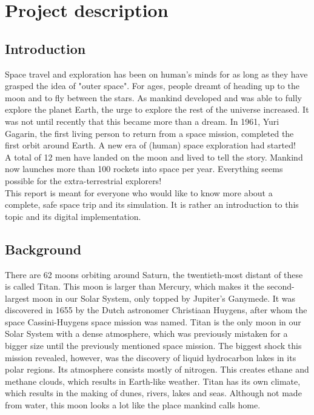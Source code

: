\documentclass[10pt,a4paper]{article}
\begin{document}
	\section{Project description}
	
	\subsection{Introduction}
	Space travel and exploration has been on human's minds for as long as they have grasped the idea of "outer space". For ages, people dreamt of heading up to the moon and to fly between the stars. As mankind developed and was able to fully explore the planet Earth, the urge to explore the rest of the universe increased. It was not until recently that this became more than a dream. In 1961, Yuri Gagarin, the first living person to return from a space mission, completed the first orbit around Earth. A new era of (human) space exploration had started!\\
	
	A total of 12 men have landed on the moon and lived to tell the story. Mankind now launches more than 100 rockets into space per year. Everything seems possible for the extra-terrestrial explorers!\\
	
	This report is meant for everyone who would like to know more about a complete, safe space trip and its simulation. It is rather an introduction to this topic and its digital implementation. \\
	
	\subsection{Background}
	There are 62 moons orbiting around Saturn, the twentieth-most distant of these is called Titan. This moon is larger than Mercury, which makes it the second-largest moon in our Solar System, only topped by Jupiter's Ganymede. It was discovered in 1655 by the Dutch astronomer Christiaan Huygens, after whom the space Cassini-Huygens space mission was named. Titan is the only moon in our Solar System with a dense atmosphere, which was previously mistaken for a bigger size until the previously mentioned space mission. The biggest shock this mission revealed, however, was the discovery of liquid hydrocarbon lakes in its polar regions. Its atmosphere consists mostly of nitrogen. This creates ethane and methane clouds, which results in Earth-like weather. Titan has its own climate, which results in the making of dunes, rivers, lakes and seas. Although not made from water, this moon looks a lot like the place mankind calls home. 
	
\end{document}
